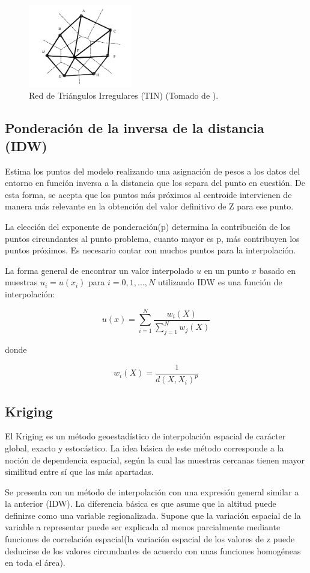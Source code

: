\begin{figure}
\centering
\includegraphics[width=0.4\textwidth]{capitulo-2/graphics/TIN-cPachecoMDE2003.png}
\caption{\label{fig:sig-tin}Red de Triángulos Irregulares (TIN) (Tomado de \cite{cPachecoMDE2003}).}
\end{figure}


\subsection{Ponderación de la inversa de la distancia (IDW)}
Estima los puntos del modelo realizando una asignación de pesos a los datos del entorno en función inversa a la
distancia que los separa del punto en cuestión. De esta forma, se acepta que los puntos más próximos al centroide
intervienen de manera más relevante en la obtención del valor definitivo de Z para ese punto.

La elección del exponente de ponderación(p) determina la contribución de los puntos circundantes al punto 
problema, cuanto mayor es p, más contribuyen los puntos próximos. Es necesario contar con muchos puntos para la
interpolación.

La forma general de encontrar un valor interpolado $u$ en un punto $x$ basado en muestras $u_i = u (x_i)$ para 
$i = 0,1, ..., N$ utilizando IDW es una función de interpolación:

\begin{equation}
 u(x) = \sum_{i=1}^{N} \frac{w_i(X)}{\sum_{j=1}^{N} w_j(X)}
\end{equation}

donde 

\begin{equation} 
w_i(X) =  \frac{1}{d(X, X_i)^p} 
\end{equation}

\subsection{Kriging}
El Kriging es un método geoestadístico de interpolación espacial de carácter global, exacto y estocástico. La 
idea básica de este método corresponde a la noción de dependencia espacial, según la cual las muestras cercanas
tienen mayor similitud entre sí que las más apartadas\cite{NINO2011}.

Se presenta con un método de interpolación con una expresión general similar a la anterior (IDW). La diferencia
básica es que asume que la altitud puede definirse como una variable regionalizada. Supone que la variación
espacial de la variable a representar puede ser explicada al menos parcialmente mediante funciones de correlación
espacial(la variación espacial de los valores de z puede deducirse de los valores circundantes de acuerdo con unas
funciones homogéneas en toda el área).
